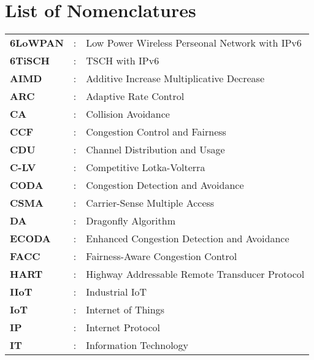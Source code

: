 \chapter*{List of Nomenclatures}
\noindent

\begin{table}
\begin{spacing}{1.5}
	\begin{tabular}{lll}
		\textbf{6LoWPAN} & : & Low Power Wireless Perseonal Network with IPv6    \\
		\textbf{6TiSCH}  & : & TSCH with IPv6                                    \\
		\textbf{AIMD}    & : & Additive Increase Multiplicative Decrease         \\
		\textbf{ARC}     & : & Adaptive Rate Control                             \\
		\textbf{CA}      & : & Collision Avoidance                               \\
		\textbf{CCF}     & : & Congestion Control and Fairness                   \\
		\textbf{CDU}     & : & Channel Distribution and Usage                    \\
		\textbf{C-LV}    & : & Competitive Lotka-Volterra                        \\
		\textbf{CODA}    & : & Congestion Detection and Avoidance                \\
		\textbf{CSMA}    & : & Carrier-Sense Multiple Access                     \\
		\textbf{DA}      & : & Dragonfly Algorithm                               \\
		\textbf{ECODA}   & : & Enhanced Congestion Detection and Avoidance       \\
		\textbf{FACC}    & : & Fairness-Aware Congestion Control                 \\
		\textbf{HART}    & : & Highway Addressable Remote Transducer Protocol    \\
		\textbf{IIoT}    & : & Industrial IoT                                    \\
		\textbf{IoT}     & : & Internet of Things                                \\
		\textbf{IP}      & : & Internet Protocol                                 \\
		\textbf{IT}      & : & Information Technology                            \\

\end{tabular}
\end{spacing}
\end{table}
